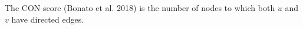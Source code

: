 \documentclass[preview]{standalone}
\begin{document}
The CON score (Bonato et al. 2018) is the number of nodes to which both $u$ and $v$ have directed edges.\\
\end{document}
